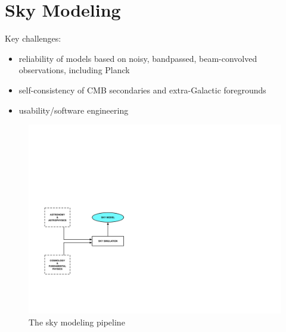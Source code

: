 
\section{Sky Modeling}

Key challenges: 
\begin{itemize} 
\item reliability of models based on noisy, bandpassed, beam-convolved observations, including Planck
\item self-consistency of CMB secondaries and extra-Galactic foregrounds
\item usability/software engineering
\end{itemize} 

\begin{figure}[htbp]
\centering
\includegraphics[width=1\textwidth]{Analysis/sm}
\caption{The sky modeling pipeline}
\label{default}

\end{figure}

%



